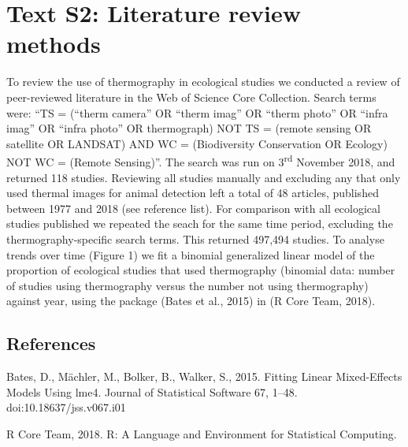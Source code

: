 
\pagebreak
\section{Text S2: Literature review methods}

To review the use of thermography in ecological studies we conducted a review of peer-reviewed literature in the Web of Science Core Collection. Search terms were: ``TS = (``therm\* camera'' OR ``therm\* imag\*'' OR ``therm\* photo'' OR ``infra\* imag\*'' OR ``infra\* photo'' OR thermograph\*) NOT TS = (remote sensing OR satellite OR LANDSAT) AND WC = (Biodiversity Conservation OR Ecology) NOT WC = (Remote Sensing)''. The search was run on 3\textsuperscript{rd} November 2018, and returned 118 studies. Reviewing all studies manually and excluding any that only used thermal images for animal detection left a total of 48 articles, published between 1977 and 2018 (see reference list). For comparison with all ecological studies published we repeated the seach for the same time period, excluding the thermography-specific search terms. This returned 497,494 studies. To analyse trends over time (Figure 1) we fit a binomial generalized linear model of the proportion of ecological studies that used thermography (binomial data: number of studies using thermography versus the number not using thermography) against year, using the package  (Bates et al., 2015) in  (R Core Team, 2018).

\nocite{*}

\subsection*{References}

Bates, D., Mächler, M., Bolker, B., Walker, S., 2015. Fitting Linear Mixed-Effects Models Using lme4. Journal of Statistical Software 67, 1–48. doi:10.18637/jss.v067.i01

R Core Team, 2018. R: A Language and Environment for Statistical Computing.

\renewcommand\bibsection{\subsection*{\refname}}
\renewcommand\refname{Thermography literature}


